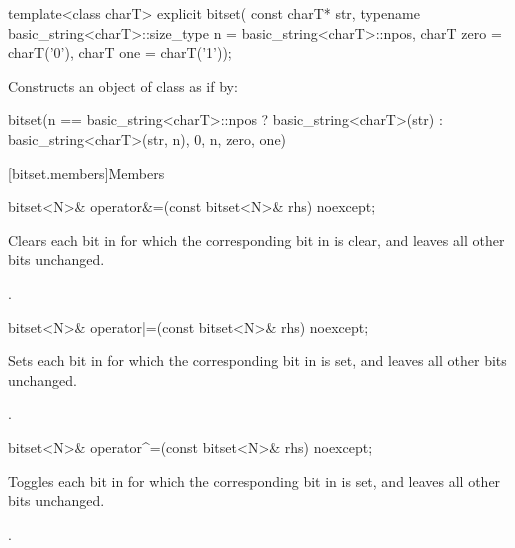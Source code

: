%
\begin{itemdecl}
template<class charT>
  explicit bitset(
    const charT* str,
    typename basic_string<charT>::size_type n = basic_string<charT>::npos,
    charT zero = charT('0'),
    charT one = charT('1'));
\end{itemdecl}

\begin{itemdescr}
\pnum
\effects Constructs an object of class  as if by:
\begin{codeblock}
bitset(n == basic_string<charT>::npos
          ? basic_string<charT>(str)
          : basic_string<charT>(str, n),
       0, n, zero, one)
\end{codeblock}
\end{itemdescr}


[bitset.members]{Members}

%
\begin{itemdecl}
bitset<N>& operator&=(const bitset<N>& rhs) noexcept;
\end{itemdecl}

\begin{itemdescr}
\pnum
\effects
Clears each bit in
for which the corresponding bit in  is clear, and leaves all other bits unchanged.

\pnum
\returns
{}.
\end{itemdescr}

%
\begin{itemdecl}
bitset<N>& operator|=(const bitset<N>& rhs) noexcept;
\end{itemdecl}

\begin{itemdescr}
\pnum
\effects
Sets each bit in
for which the corresponding bit in  is set, and leaves all other bits unchanged.

\pnum
\returns
{}.
\end{itemdescr}

%
\begin{itemdecl}
bitset<N>& operator^=(const bitset<N>& rhs) noexcept;
\end{itemdecl}

\begin{itemdescr}
\pnum
\effects
Toggles each bit in
for which the corresponding bit in  is set, and leaves all other bits unchanged.

\pnum
\returns
{}.
\end{itemdescr}

